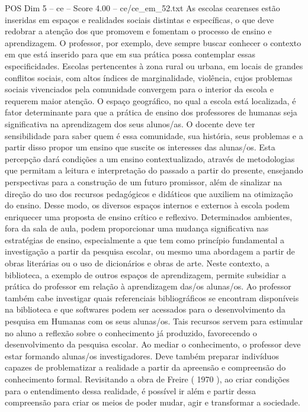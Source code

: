 \begin{textsample}{POS Dim 5 – ce – Score 4.00 – ce/ce\_em\_52.txt}
As escolas cearenses estão inseridas em espaços e realidades sociais distintas e específicas, o que deve redobrar a atenção dos que promovem e fomentam o processo de ensino e aprendizagem.
O professor, por exemplo, deve sempre buscar conhecer o contexto em que está inserido para que em sua prática possa contemplar essas especificidades.
Escolas pertencentes à zona rural ou urbana, em locais de grandes conflitos sociais, com altos índices de marginalidade, violência, cujos problemas sociais vivenciados pela comunidade convergem para o interior da escola e requerem maior atenção.
O espaço geográfico, no qual a escola está localizada, é fator determinante para que a prática de ensino dos professores de humanas seja significativa na aprendizagem dos seus alunos/as.
O docente deve ter sensibilidade para saber quem é essa comunidade, sua história, seus problemas e a partir disso propor um ensino que suscite os interesses das alunas/os.
Esta percepção dará condições a um ensino contextualizado, através de metodologias que permitam a leitura e interpretação do passado a partir do presente, ensejando perspectivas para a construção de um futuro promissor, além de sinalizar na direção do uso dos recursos pedagógicos e didáticos que auxiliem na otimização do ensino.
Desse modo, os diversos espaços internos e externos à escola podem enriquecer uma proposta de ensino crítico e reflexivo.
Determinados ambientes, fora da sala de aula, podem proporcionar uma mudança significativa nas estratégias de ensino, especialmente a que tem como princípio fundamental a investigação a partir da pesquisa escolar, ou mesmo uma abordagem a partir de obras literárias ou o uso de dicionários e obras de arte.
Neste contexto, a biblioteca, a exemplo de outros espaços de aprendizagem, permite subsidiar a prática do professor em relação à aprendizagem das/os alunas/os.
Ao professor também cabe investigar quais referenciais bibliográficos se encontram disponíveis na biblioteca e que softwares podem ser acessados para o desenvolvimento da pesquisa em Humanas com os seus alunas/os.
Tais recursos servem para estimular no aluno a reflexão sobre o conhecimento já produzido, favorecendo o desenvolvimento da pesquisa escolar.
Ao mediar o conhecimento, o professor deve estar formando alunas/os investigadores.
Deve também preparar indivíduos capazes de problematizar a realidade a partir da apreensão e compreensão do conhecimento formal.
Revisitando a obra de Freire ( 1970 ), ao criar condições para o entendimento dessa realidade, é possível ir além e partir dessa compreensão para criar os meios de poder mudar, agir e transformar a sociedade.

\end{textsample}
